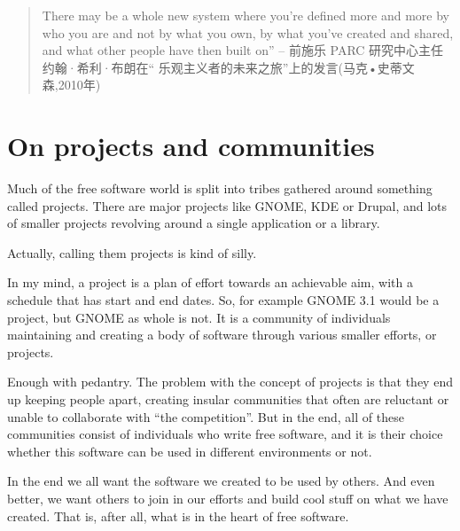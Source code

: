 ﻿


\begin{quote}
There may be a whole new system where you're defined more and more by who you
are and not by what you own, by what you've created and shared, and what other
people have then built on” -- 前施乐 PARC 研究中心主任约翰·希利·布朗在“
乐观主义者的未来之旅”上的发言(马克•史蒂文森,2010年)
\end{quote}

\section*{On projects and communities}

Much of the free software world is split into tribes gathered around something
called projects. There are major projects like GNOME, KDE or Drupal, and lots of
smaller projects revolving around a single application or a library.

Actually, calling them projects is kind of silly.

In my mind, a project is a plan of effort towards an achievable aim, with a
schedule that has start and end dates. So, for example GNOME 3.1 would be a
project, but GNOME as whole is not. It is a community of individuals maintaining
and creating a body of software through various smaller efforts, or projects.

Enough with pedantry. The problem with the concept of projects is that they end
up keeping people apart, creating insular communities that often are reluctant
or unable to collaborate with ``the competition''. But in the end, all of these
communities consist of individuals who write free software, and it is their
choice whether this software can be used in different environments or not.

In the end we all want the software we created to be used by others. And even
better, we want others to join in our efforts and build cool stuff on what we
have created. That is, after all, what is in the heart of free software.

